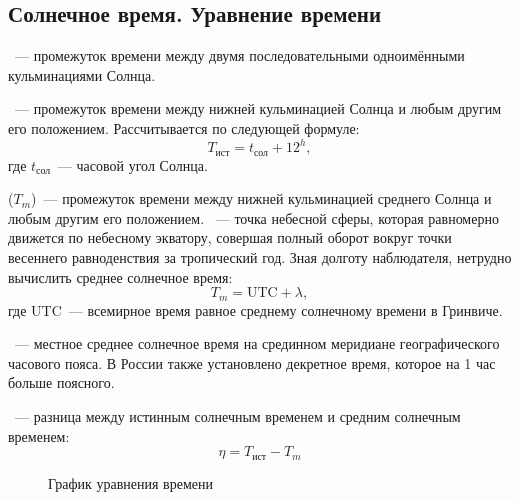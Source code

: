 \subsection{Солнечное время. Уравнение времени}
~--- промежуток времени между двумя последовательными одноимёнными кульминациями Солнца.

~--- промежуток времени между нижней кульминацией Солнца и любым другим его положением. Рассчитывается по следующей формуле:
\begin{equation}
T_{\text{ист}}=t_{\text{сол}}+12^h,
\end{equation}
где $t_{\text{сол}}$~--- часовой угол Солнца.

 ($T_m$)~--- промежуток времени между нижней кульминацией среднего Солнца и любым другим его положением. ~--- точка небесной сферы, которая равномерно движется по небесному экватору, совершая полный оборот вокруг точки весеннего равноденствия за тропический год. Зная долготу наблюдателя, нетрудно вычислить среднее солнечное время:
\begin{equation}
T_m = \text{UTC} + \lambda,
\end{equation}
где UTC~--- всемирное время равное среднему солнечному времени в Гринвиче.

~--- местное среднее солнечное время на срединном меридиане географического часового пояса. В России также установлено декретное время, которое на 1 час больше поясного.


~--- разница между истинным солнечным временем и средним солнечным временем:
\begin{equation}
\eta=T_{\text{ист}}-T_m
\end{equation}


\begin{figure}[!h]
\centering
{}
\caption{График уравнения времени}
\end{figure}